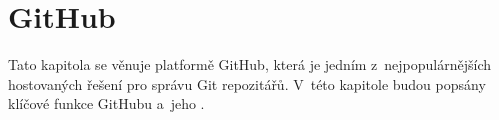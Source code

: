 
\chapter{GitHub}
\label{chap:github}
Tato kapitola se věnuje platformě GitHub, která je jedním z~nejpopulárnějších hostovaných řešení pro správu Git repozitářů. V~této kapitole budou popsány klíčové funkce GitHubu a~jeho \API{}.





\endinput